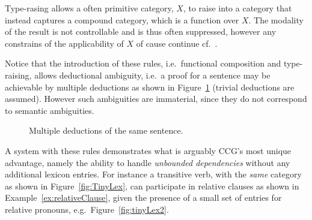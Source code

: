 Type-rasing allows a often primitive category, $X$, to raise into a category that instead captures a compound category, which is a function over $X$. The modality of the result is not controllable and is thus often suppressed, however any constrains of the applicability of $X$ of cause continue cf.\ \cite{multiModalCCG}.

Notice that the introduction of these rules, i.e.\ functional composition and type-raising, allows deductional ambiguity, i.e.\ a proof for a sentence may be achievable by multiple deductions as shown in Figure~\ref{fig:multipleDeductions} (trivial deductions are assumed). However such ambiguities are immaterial, since they do not correspond to semantic ambiguities.

\begin{figure}[ht]
\vspace{1em}
\begin{minipage}[b]{0.5\linewidth}
\center
{}
\end{minipage}
\hfill
\begin{minipage}[b]{0.5\linewidth}
\center
{}
\end{minipage}
  \caption{Multiple deductions of the same sentence.}
  \label{fig:multipleDeductions}
  \vspace{1em}
\end{figure}


A system with these rules demonstrates what is arguably CCG's most unique advantage, namely the ability to handle \emph{unbounded dependencies} without any additional lexicon entries. For instance a transitive verb, with the \emph{same} category as shown in Figure~\ref{fig:TinyLex}, can participate in relative clauses as shown in Example~\ref{ex:relativeClause}, given the presence of a small set of entries for relative pronouns, e.g.\ Figure~\ref{fig:tinyLex2}.

